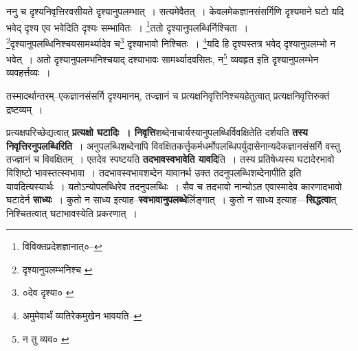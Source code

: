 \documentclass[article,12pt,a4paper]{memoir}
\begin{document}
	  \pstart ननु च दृश्यनिवृत्तिरवसीयते दृश्यानुपलम्भात् । सत्यमेवैतत् । केवलमेकज्ञानसंसर्गिणि दृश्यमाने घटो यदि भवेद् दृश्य एव भवेदिति दृश्यः सम्भावितः । \footnote{विविक्तप्रदेशज्ञानात्०--\cite{dp-msD-n}}\-ततो दृश्यानुपलब्धिर्निश्चिता । \footnote{दृश्यानुपलम्भनिश्च \cite{dp-msC} \cite{dp-msD}}\-दृश्यानुपलब्धिनिश्चयसामर्थ्यादेव च\footnote{०देव दृश्या० \cite{dp-edE}} दृश्याभावो निश्चितः । \footnote{अमुमेवार्थं व्यतिरेकमुखेन भावयति--\cite{dp-msD-n}}\-यदि हि दृश्यस्तत्र भवेद् दृश्यानुपलम्भो न भवेत् । अतो दृश्यानुपलम्भनिश्चयाद् दश्याभावः सामर्थ्यादवसितः, न\footnote{न तु व्यव० \cite{dp-msA} \cite{dp-edP} \cite{dp-edH} \cite{dp-edE} \cite{dp-edN}} व्यवहृत इति दृश्यानुपलम्भेन व्यवहर्त्तव्यः ।
	\pend
       

	  \pstart तस्मादर्थान्तरम्--एकज्ञानसंसर्गि दृश्यमानम्, तज्ज्ञानं च प्रत्यक्षनिवृत्तिनिश्चयहेतुत्वात् प्रत्यक्षनिवृत्तिरुक्तं द्रष्टव्यम् ।
	\pend
      
	  \endgroup
	

	  \pstart प्रत्यक्षपरिच्छेद्यत्वात् \textbf{प्रत्यक्षो घटादिः । निवृत्ति}शब्देनाचार्यस्यानुपलब्धिर्विवक्षितेति दर्शयति \textbf{तस्य निवृत्तिरनुपलब्धिरिति} । अनुपलब्धिशब्देनापि विवक्षितकर्त्तृकर्मधर्मोपलब्धिपर्युदासेनान्यदेकज्ञानसंसर्गि वस्तु तज्ज्ञानं च विवक्षितम् । \leavevmode{}एतदेव स्पष्टयति \textbf{तदभावस्वभावेति यावदि}ति । तस्य प्रतिषेध्यस्य घटादेरभावो विशिष्टो भावस्तत्स्वभावा । तदभावस्वभावशब्देन यावानर्थ उक्त तदनुपलब्धिशब्देनापीति इति यावदित्यस्यार्थः । यतोऽन्योपलब्धिरेव तदनुपलब्धिः । सैव च तदभावो नान्योऽत एवास्मादेव कारणादभावो घटादेर्न \textbf{साध्यः} । कुतो न साध्य इत्याह--\textbf{स्वभावानुपलब्धे}र्लिङ्गात् । कुतो न साध्य इत्याह—\textbf{सिद्धत्वा}त् निश्चितत्वात् घटाभावस्येति प्रकरणात् ।
	\pend
      
\end{document}
